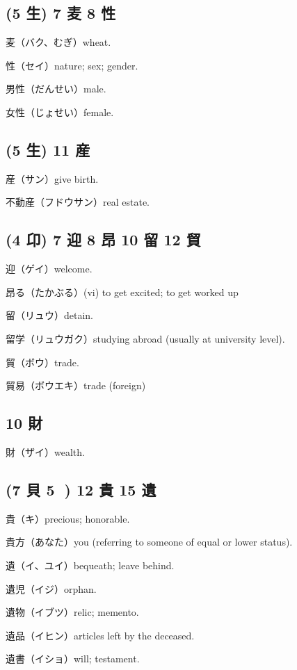 \subsection{(5 生) 7 麦 8 性}

麦（バク、むぎ）wheat.

性（セイ）nature; sex; gender.

男性（だんせい）male.

女性（じょせい）female.

\subsection{(5 生) 11 産}

産（サン）give birth.

不動産（フドウサン）real estate.

\subsection{(4 卬) 7 迎 8 昂 10 留 12 貿}

迎（ゲイ）welcome.

昂る（たかぶる）(vi) to get excited; to get worked up

留（リュウ）detain.

留学（リュウガク）studying abroad (usually at university level).

貿（ボウ）trade.

貿易（ボウエキ）trade (foreign)

\subsection{10 財}

財（ザイ）wealth.

\subsection{(7 貝 5 𠀐) 12 貴 15 遺}

貴（キ）precious; honorable.

貴方（あなた）you (referring to someone of equal or lower status).

遺（イ、ユイ）bequeath; leave behind.

遺児（イジ）orphan.

遺物（イブツ）relic; memento.

遺品（イヒン）articles left by the deceased.

遺書（イショ）will; testament.

